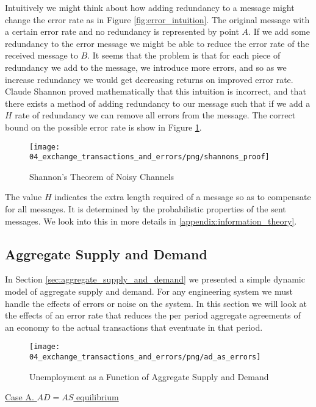 Intuitively we might think about how adding redundancy to a message might change the error rate as
in Figure \ref{fig:error_intuition}. The original message with a certain error rate and no
redundancy is represented by point $A$. If we add some redundancy to the error message we might be
able to reduce the error rate of the received message to $B$. It seems that the problem is that for
each piece of redundancy we add to the message, we introduce more errors, and so as we increase
redundancy we would get decreasing returns on improved error rate. Claude Shannon proved
mathematically that this intuition is incorrect, and that there exists a method of adding redundancy
to our message such that if we add a $H$ rate of redundancy we can remove all errors from the
message. The correct bound on the possible error rate is show in Figure \ref{fig:shannons_proof}.

\begin{figure}[H]
\centering
\texttt{[image: 04\_exchange\_transactions\_and\_errors/png/shannons\_proof]}
\caption{Shannon's Theorem of Noisy Channels}
\label{fig:shannons_proof}
\end{figure}

The value $H$ indicates the extra length required of a message so as to compensate for all messages.
It is determined by the probabilistic properties of the sent messages. We look into this in more
details in \ref{appendix:information_theory}.

\subsection{Aggregate Supply and Demand}
\label{sec:aggregate_supply_and_demand_with_noise}

In Section \ref{sec:aggregate_supply_and_demand} we presented a simple dynamic model of aggregate supply and
demand. For any engineering system we must handle the effects of errors or noise on the system. In
this section we will look at the effects of an error rate that reduces the per period aggregate
agreements of an economy to the actual transactions that eventuate in that period.

\begin{figure}[H]
\centering
\texttt{[image: 04\_exchange\_transactions\_and\_errors/png/ad\_as\_errors]}
\caption{Unemployment as a Function of Aggregate Supply and Demand}
\label{fig:ad_as_errors}
\end{figure}

\underline{Case A. $AD=AS$ equilibrium}

